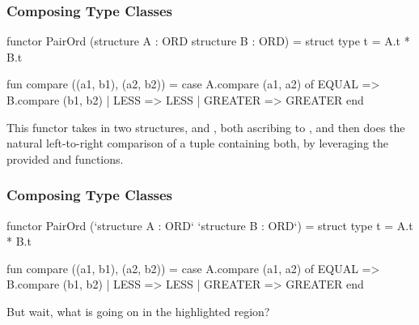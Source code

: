 \documentclass[aspectratio=169, handout]{beamer}
\begin{document}
\begin{frame}[fragile]
  \frametitle{Composing Type Classes}

  \begin{codeblock}
    functor PairOrd (structure A : ORD
                     structure B : ORD) =
      struct
        type t = A.t * B.t

        fun compare ((a1, b1), (a2, b2)) =
          case A.compare (a1, a2) of
            EQUAL   => B.compare (b1, b2)
          | LESS    => LESS
          | GREATER => GREATER
      end
  \end{codeblock}

  \pause
  \vspace{\fill}

  This functor takes in two structures,  and , both ascribing
  to , and then does the natural left-to-right comparison of a
  tuple containing both, by leveraging the provided  and
   functions.
\end{frame}

\begin{frame}[fragile]
  \frametitle{Composing Type Classes}

  \begin{codeblock}
    functor PairOrd (`structure A : ORD`
                     `structure B : ORD`) =
      struct
        type t = A.t * B.t

        fun compare ((a1, b1), (a2, b2)) =
          case A.compare (a1, a2) of
            EQUAL   => B.compare (b1, b2)
          | LESS    => LESS
          | GREATER => GREATER
      end
  \end{codeblock}

  \pause
  \vspace{\fill}

  But wait, what is going on in the highlighted region?
\end{frame}
\end{document}
